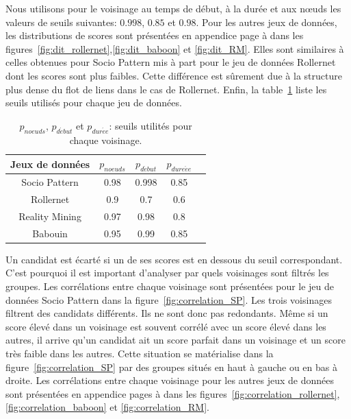 
Nous utilisons pour le voisinage au temps de début, à la durée et aux n\oe{}uds les valeurs de seuils suivantes: $0.998$, $0.85$ et $0.98$.
Pour les autres jeux de données, les distributions de scores sont présentées en appendice page \pageref{fig:dit_rollernet} à \pageref{fig:dit_RM} dans les figures~\ref{fig:dit_rollernet},\ref{fig:dit_baboon} et \ref{fig:dit_RM}.
Elles sont similaires à celles obtenues pour Socio Pattern mis à part pour le jeu de données Rollernet dont les scores sont plus faibles.
Cette différence est sûrement due à la structure plus dense du flot de liens dans le cas de Rollernet.
Enfin, la table~\ref{tab:thresholds} liste les seuils utilisés pour chaque jeu de données.
\begin{table}
\centering
\begin{tabular}{|c|c|c|c|c|}
\hline \rule[-1ex]{0pt}{3.5ex}
Jeux de données & $p_{noeuds}$ & $p_{d\acute{e}but}$  & $p_{dure\acute{e}e}$  \\
\hline
Socio Pattern & 0.98 & 0.998 & 0.85 \\
Rollernet& 0.9 & 0.7 & 0.6 \\
Reality Mining & 0.97  & 0.98 & 0.8 \\
Babouin & 0.95  &  0.99  & 0.85 \\
\hline
\end{tabular}
\caption{$p_{noeuds}$, $p_{d\acute{e}but}$ et  $p_{dur\acute{e}e}$: seuils utilités pour chaque voisinage.}
\label{tab:thresholds}       %
\end{table}

Un candidat est écarté si un de ses scores est en dessous du seuil correspondant. 
C'est pourquoi il est important d'analyser par quels voisinages sont filtrés les groupes.
Les corrélations entre chaque voisinage sont présentées pour le jeu de données Socio Pattern dans la figure~\ref{fig:correlation_SP}.
Les trois voisinages filtrent des candidats différents.
Ils ne sont donc pas redondants.
Même si un score élevé dans un voisinage est souvent corrélé avec un score élevé dans les autres, il arrive qu'un candidat ait un score parfait dans un voisinage et un score très faible dans les autres.
Cette situation se matérialise dans la figure~\ref{fig:correlation_SP} par des groupes situés en haut à gauche ou en bas à droite.
Les corrélations entre chaque voisinage pour les autres jeux de données sont présentées en appendice pages \pageref{fig:correlation_rollernet} à \pageref{fig:correlation_RM} dans les figures~\ref{fig:correlation_rollernet},\ref{fig:correlation_baboon} et \ref{fig:correlation_RM}.


